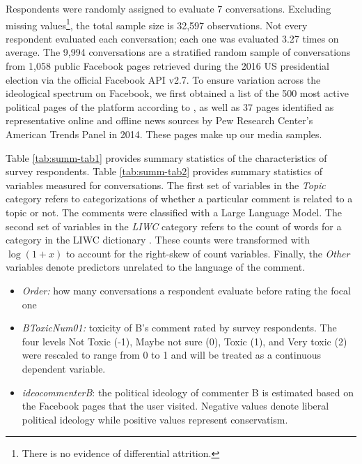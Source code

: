 \documentclass{article}
\begin{document}
Respondents were randomly assigned to evaluate 7 conversations. Excluding missing values\footnote{There is no evidence of differential attrition.}, the total sample size is 32,597 observations. Not every respondent evaluated each conversation; each one was evaluated 3.27 times on average. The 9,994 conversations are a stratified random sample of conversations from 1,058 public Facebook pages retrieved during the 2016 US presidential election via the official Facebook API v2.7. To ensure variation across the ideological spectrum on Facebook, we first obtained a list of the 500 most active political pages of the platform according to \citet{bakshy_exposure_2015}, as well as 37 pages identified as representative online and offline news sources by Pew Research Center’s American Trends Panel in 2014. These pages make up our media samples.

Table \ref{tab:summ-tab1} provides summary statistics of the characteristics of survey respondents.
Table \ref{tab:summ-tab2} provides summary statistics of variables measured for conversations. The first set of variables in the \textit{Topic} category refers to categorizations of whether a particular comment is related to a topic or not. The comments were classified with a Large Language Model.
The second set of variables in the \textit{LIWC} category refers to the count of words for a category in the LIWC dictionary \citep{pennebaker_linguistic_2022}. These counts were transformed with $\log(1+x)$ to account for the right-skew of count variables. Finally, the \textit{Other} variables denote predictors unrelated to the language of the comment. 

\begin{itemize}
    \item \textit{Order:} how many conversations a respondent evaluate before rating the focal one
    \item \textit{BToxicNum01:} toxicity of B's comment rated by survey respondents. The four levels Not Toxic (-1), Maybe not sure (0), Toxic (1), and Very toxic (2) were rescaled to range from 0 to 1 and will be treated as a continuous dependent variable.
    \item \textit{ideocommenterB}: the political ideology of commenter B is estimated based on the Facebook pages that the user visited. Negative values denote liberal political ideology while positive values represent conservatism.
\end{itemize}



\end{document}
